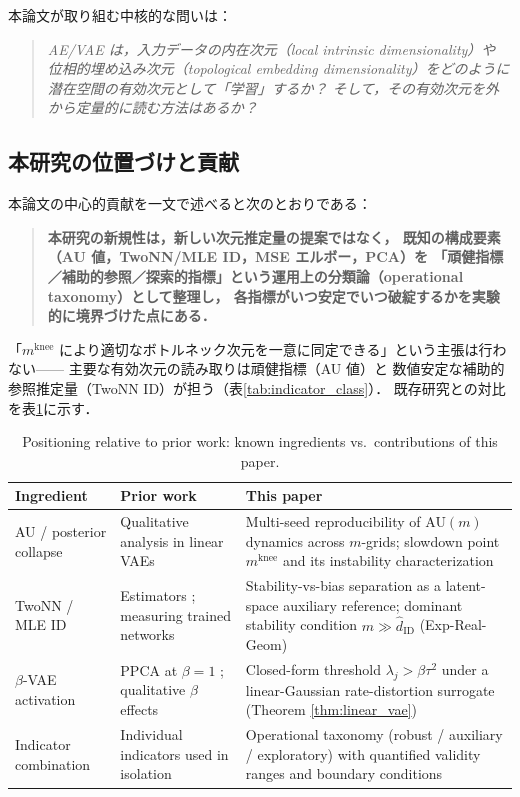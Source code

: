 \documentclass[11pt,a4paper]{jsarticle}
\newcommand{\mknee}{m^{\mathrm{knee}}}
\begin{document}
本論文が取り組む中核的な問いは：
\begin{quote}
\textit{AE/VAE は，入力データの内在次元（local intrinsic dimensionality）や
位相的埋め込み次元（topological embedding dimensionality）をどのように
潜在空間の有効次元として「学習」するか？
そして，その有効次元を外から定量的に読む方法はあるか？}
\end{quote}

\subsection{本研究の位置づけと貢献}\label{sec:intro_aim}

本論文の中心的貢献を一文で述べると次のとおりである：
\begin{quote}
\textbf{本研究の新規性は，新しい次元推定量の提案ではなく，
既知の構成要素（AU 値，TwoNN/MLE ID，MSE エルボー，PCA）を
「頑健指標／補助的参照／探索的指標」という運用上の分類論（operational taxonomy）として整理し，
各指標がいつ安定でいつ破綻するかを実験的に境界づけた点にある．}
\end{quote}
「$\mknee$ により適切なボトルネック次元を一意に同定できる」という主張は行わない——
主要な有効次元の読み取りは頑健指標（AU 値）と
数値安定な補助的参照推定量（TwoNN ID）が担う（表\ref{tab:indicator_class}）．
既存研究との対比を表\ref{tab:novelty}に示す．

\begin{table}[H]
\centering
\caption{Positioning relative to prior work: known ingredients vs.\ contributions of this paper.}
\label{tab:novelty}
\small
\begin{tabular}{p{3.6cm}p{4.9cm}p{5.6cm}}
\toprule
Ingredient & Prior work & This paper \\
\midrule
AU / posterior collapse & Qualitative analysis in linear VAEs \cite{lucas2019elbo} & Multi-seed reproducibility of AU$(m)$ dynamics across $m$-grids; slowdown point $\mknee$ and its instability characterization \\
TwoNN / MLE ID & Estimators \cite{facco2017twonn,levina2005mle}; measuring trained networks \cite{ansuini2019intrinsic,pope2021intrinsic} & Stability-vs-bias separation as a latent-space auxiliary reference; dominant stability condition $m \gg \hat{d}_\mathrm{ID}$ (Exp-Real-Geom) \\
$\beta$-VAE activation & PPCA at $\beta=1$ \cite{tippingbishop1999ppca}; qualitative $\beta$ effects \cite{higgins2017betavae,lucas2019elbo} & Closed-form threshold $\lambda_j > \beta\tau^2$ under a linear-Gaussian rate-distortion surrogate (Theorem \ref{thm:linear_vae}) \\
Indicator combination & Individual indicators used in isolation & Operational taxonomy (robust / auxiliary / exploratory) with quantified validity ranges and boundary conditions \\
\bottomrule
\end{tabular}
\end{table}
\end{document}

